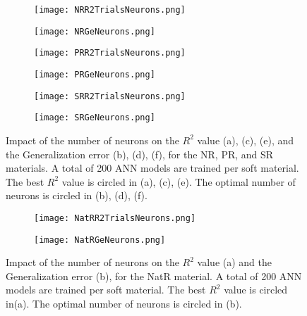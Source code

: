\begin{figure}[htbp!]
	\centering
    
    \begin{subfigure}[b]{0.49\textwidth}
        \centering
        \texttt{[image: NRR2TrialsNeurons.png]}
        \caption{}
        \label{fig:TrialsNeuronsNR}
    \end{subfigure}
\begin{subfigure}[b]{0.49\textwidth}
	\centering
	\texttt{[image: NRGeNeurons.png]}
	\caption{}
	\label{fig:GenNeuronsNR}
\end{subfigure}
    
    \begin{subfigure}[b]{0.49\textwidth}
        \centering
        \texttt{[image: PRR2TrialsNeurons.png]}
        \caption{}
        \label{fig:TrialsNeuronsPR}
    \end{subfigure}
\begin{subfigure}[b]{0.49\textwidth}
	\centering
	\texttt{[image: PRGeNeurons.png]}
	\caption{}
	\label{fig:GenNeuronsPR}
\end{subfigure}
    
    \begin{subfigure}[b]{0.49\textwidth}
        \centering
        \texttt{[image: SRR2TrialsNeurons.png]}
        \caption{}
        \label{fig:TrialsNeuronsSR}
    \end{subfigure}
\begin{subfigure}[b]{0.49\textwidth}
	\centering
	\texttt{[image: SRGeNeurons.png]}
	\caption{}
	\label{fig:GenNeuronsSR}
\end{subfigure}
    \caption{Impact of the number of neurons on the $R^2$ value (a), (c), (e), and the Generalization error (b), (d), (f), for the NR, PR, and SR materials. A total of 200 ANN models are trained per soft material. The best $R^2$ value is circled in (a), (c), (e). The optimal number of neurons is circled in (b), (d), (f).}
    \label{fig:TrialsNeurons2}
\end{figure}

\begin{figure}[htbp!]
	\centering    
    \begin{subfigure}[b]{0.49\textwidth}
        \centering
        \texttt{[image: NatRR2TrialsNeurons.png]}
        \caption{}
        \label{fig:TrialsNeuronsNatR}
    \end{subfigure}
	\begin{subfigure}[b]{0.49\textwidth}
		\centering
		\texttt{[image: NatRGeNeurons.png]}
		\caption{}
		\label{fig:GenNeuronsNatR}
	\end{subfigure}
    \caption{Impact of the number of neurons on the $R^2$ value (a) and the Generalization error (b), for the NatR material. A total of 200 ANN models are trained per soft material. The best $R^2$ value is circled in(a). The optimal number of neurons is circled in (b).}
    \label{fig:TrialsNeurons3}
\end{figure}



